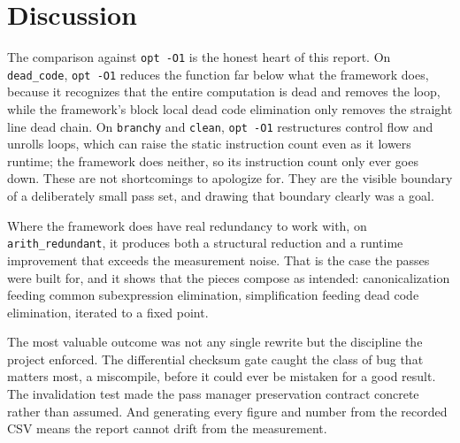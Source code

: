 \section{Discussion}

The comparison against \texttt{opt -O1} is the honest heart of this report. On
\texttt{dead\_code}, \texttt{opt -O1} reduces the function far below what the
framework does, because it recognizes that the entire computation is dead and
removes the loop, while the framework's block local dead code elimination only
removes the straight line dead chain. On \texttt{branchy} and \texttt{clean},
\texttt{opt -O1} restructures control flow and unrolls loops, which can raise the
static instruction count even as it lowers runtime; the framework does neither,
so its instruction count only ever goes down. These are not shortcomings to
apologize for. They are the visible boundary of a deliberately small pass set,
and drawing that boundary clearly was a goal.

Where the framework does have real redundancy to work with, on
\texttt{arith\_redundant}, it produces both a structural reduction and a runtime
improvement that exceeds the measurement noise. That is the case the passes were
built for, and it shows that the pieces compose as intended: canonicalization
feeding common subexpression elimination, simplification feeding dead code
elimination, iterated to a fixed point.

The most valuable outcome was not any single rewrite but the discipline the
project enforced. The differential checksum gate caught the class of bug that
matters most, a miscompile, before it could ever be mistaken for a good result.
The invalidation test made the pass manager preservation contract concrete rather
than assumed. And generating every figure and number from the recorded CSV means
the report cannot drift from the measurement.
